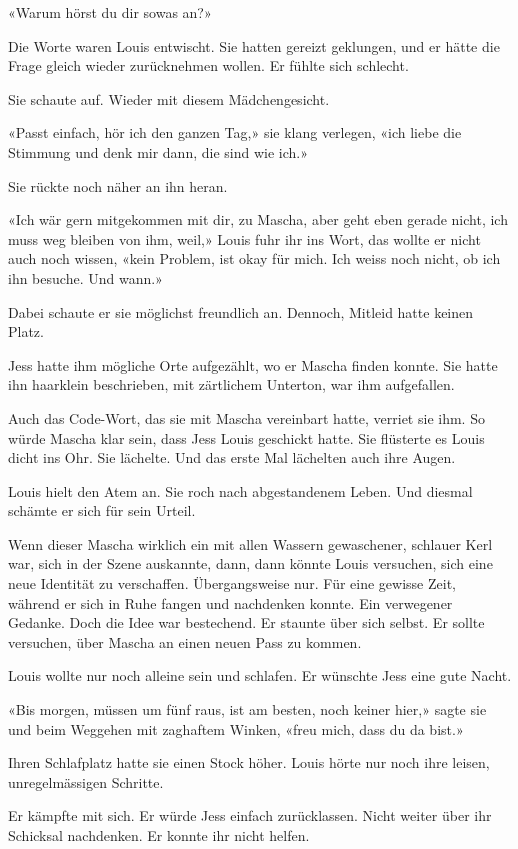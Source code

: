 «Warum hörst du dir sowas an?»

Die Worte waren Louis entwischt. Sie hatten gereizt geklungen, und er
hätte die Frage gleich wieder zurücknehmen wollen. Er fühlte sich
schlecht.

Sie schaute auf. Wieder mit diesem Mädchengesicht.

«Passt einfach, hör ich den ganzen Tag,» sie klang verlegen, «ich liebe
die Stimmung und denk mir dann, die sind wie ich.»

Sie rückte noch näher an ihn heran.

«Ich wär gern mitgekommen mit dir, zu Mascha, aber geht eben gerade
nicht, ich muss weg bleiben von ihm, weil,» Louis fuhr ihr ins Wort, das
wollte er nicht auch noch wissen, «kein Problem, ist okay für mich. Ich
weiss noch nicht, ob ich ihn besuche. Und wann.»

Dabei schaute er sie möglichst freundlich an. Dennoch, Mitleid hatte
keinen Platz.

Jess hatte ihm mögliche Orte aufgezählt, wo er Mascha finden konnte. Sie
hatte ihn haarklein beschrieben, mit zärtlichem Unterton, war ihm
aufgefallen.

Auch das Code-Wort, das sie mit Mascha vereinbart hatte, verriet sie
ihm. So würde Mascha klar sein, dass Jess Louis geschickt hatte. Sie
flüsterte es Louis dicht ins Ohr. Sie lächelte. Und das erste Mal
lächelten auch ihre Augen.

Louis hielt den Atem an. Sie roch nach abgestandenem Leben. Und diesmal
schämte er sich für sein Urteil.

Wenn dieser Mascha wirklich ein mit allen Wassern gewaschener, schlauer
Kerl war, sich in der Szene auskannte, dann, dann könnte Louis
versuchen, sich eine neue Identität zu verschaffen. Übergangsweise nur.
Für eine gewisse Zeit, während er sich in Ruhe fangen und nachdenken
konnte. Ein verwegener Gedanke. Doch die Idee war bestechend. Er staunte
über sich selbst. Er sollte versuchen, über Mascha an einen neuen Pass
zu kommen.

Louis wollte nur noch alleine sein und schlafen. Er wünschte Jess eine
gute Nacht.

«Bis morgen, müssen um fünf raus, ist am besten, noch keiner hier,»
sagte sie und beim Weggehen mit zaghaftem Winken, «freu mich, dass du da
bist.»

Ihren Schlafplatz hatte sie einen Stock höher. Louis hörte nur noch ihre
leisen, unregelmässigen Schritte.

Er kämpfte mit sich. Er würde Jess einfach zurücklassen. Nicht weiter
über ihr Schicksal nachdenken. Er konnte ihr nicht helfen.

